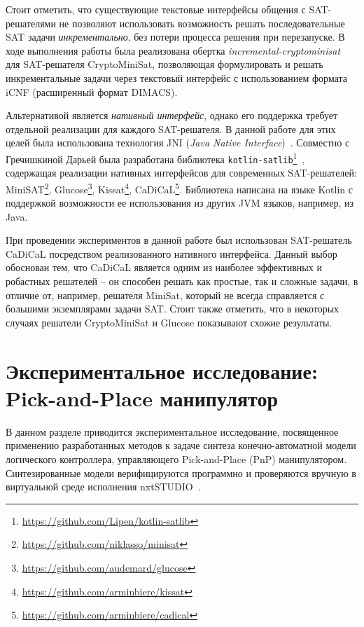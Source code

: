 Стоит отметить, что существующие текстовые интерфейсы общения с SAT-решателями не позволяют использовать возможность решать последовательные SAT задачи \emph{инкрементально}, без потери процесса решения при перезапуске.
В ходе выполнения работы была реализована обертка \textit{incremental-cryptominisat}~\cite{incremental-cryptominisat} для SAT-решателя CryptoMiniSat, позволяющая формулировать и решать инкрементальные задачи через текстовый интерфейс с использованием формата iCNF (расширенный формат DIMACS).

Альтернативой является \emph{нативный интерфейс}, однако его поддержка требует отдельной реализации для каждого SAT-решателя.
В данной работе для этих целей была использована технология JNI (\textit{Java Native Interface})~\cite{jni}.
Совместно с Гречишкиной Дарьей была разработана библиотека \texttt{kotlin-satlib}\footnote{\url{https://github.com/Lipen/kotlin-satlib}}~\cite{kmu20-jnisat}, содержащая реализации нативных интерфейсов для современных SAT-решателей: MiniSAT\footnote{\url{https://github.com/niklasso/minisat}}, Glucose\footnote{\url{https://github.com/audemard/glucose}}, Kissat\footnote{\url{https://github.com/arminbiere/kissat}}, CaDiCaL\footnote{\url{https://github.com/arminbiere/cadical}}.
Библиотека написана на языке Kotlin с поддержкой возможности ее использования из других JVM языков, например, из Java.

При проведении экспериментов в данной работе был использован SAT-решатель CaDiCaL посредством реализованного нативного интерфейса.
Данный выбор обоснован тем, что CaDiCaL является одним из наиболее эффективных и робастных решателей \--- он способен решать как простые, так и сложные задачи, в отличие от, например, решателя MiniSat, который не всегда справляется с большими экземплярами задачи SAT\@.
Стоит также отметить, что в некоторых случаях решатели CryptoMiniSat и Glucose показывают схожие результаты.


\section{Экспериментальное исследование: Pick-and-Place манипулятор}%
\label{sec:experiments-monolith-pnp}

В данном разделе приводится экспериментальное исследование, \allowbreak посвященное применению разработанных методов к задаче синтеза конечно-автоматной модели логического контроллера, управляющего Pick-and-Place (PnP) манипулятором.
Синтезированные модели верифицируются программно и проверяются вручную в виртуальной среде исполнения nxtSTUDIO~\cite{nxtstudio}.

